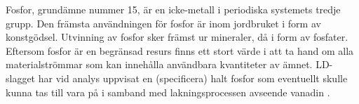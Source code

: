 Fosfor, grundämne nummer 15, är en icke-metall i periodiska systemets tredje grupp. Den främsta användningen för fosfor är inom jordbruket i form av konstgödsel. Utvinning av fosfor sker främst ur mineraler, då i form av fosfater. Eftersom fosfor är en begränsad resurs finns ett stort värde i att ta hand om alla materialströmmar som kan innehålla användbara kvantiteter av ämnet. LD-slagget har vid analys uppvisat en (specificera) halt fosfor som eventuellt skulle kunna tas till vara på i samband med lakningsprocessen avseende vanadin \cite{VanWazer2018}.




